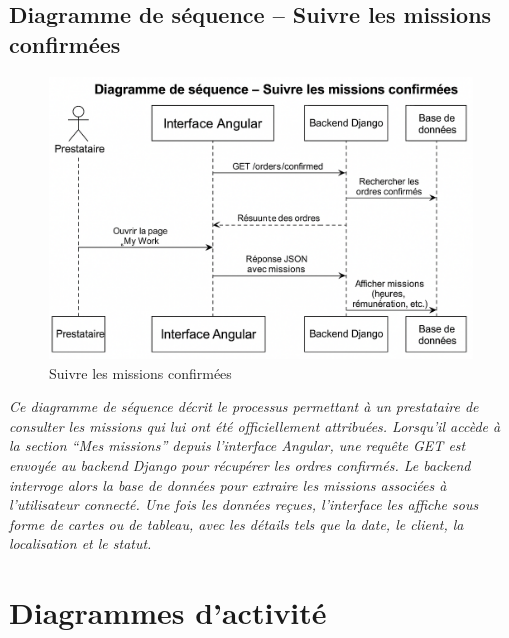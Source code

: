 \subsection*{Diagramme de séquence – Suivre les missions confirmées}
\begin{figure}[H]
\centering
\includegraphics[width=0.85\linewidth]{figures/work seq.png}
\caption{Suivre les missions confirmées}
\end{figure}

\textit{Ce diagramme de séquence décrit le processus permettant à un prestataire de consulter les missions qui lui ont été officiellement attribuées. Lorsqu’il accède à la section “Mes missions” depuis l’interface Angular, une requête GET est envoyée au backend Django pour récupérer les ordres confirmés. Le backend interroge alors la base de données pour extraire les missions associées à l’utilisateur connecté. Une fois les données reçues, l’interface les affiche sous forme de cartes ou de tableau, avec les détails tels que la date, le client, la localisation et le statut.}


\section*{Diagrammes d'activité}
